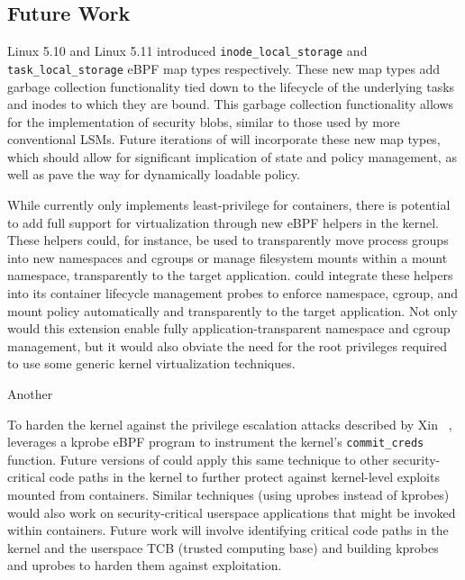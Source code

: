 \subsection{Future Work}
\label{sub:future_work}

Linux 5.10 and Linux 5.11 introduced \texttt{inode\_local\_storage} \cite{singh2020_inode_local_storage} and \texttt{task\_local\_storage} \cite{singh2020_task_local_storage} eBPF map types respectively. These new map types add garbage collection functionality tied down to the lifecycle of the underlying tasks and inodes to which they are bound. This garbage collection functionality allows for the implementation of security blobs, similar to those used by more conventional LSMs. Future iterations of \bpfcontain{} will incorporate these new map types, which should allow for significant implication of state and policy management, as well as pave the way for dynamically loadable \bpfcontain{} policy.

While \bpfcontain{} currently only implements least-privilege for containers, there is potential to add full support for virtualization through new eBPF helpers in the kernel. These helpers could, for instance, be used to transparently move process groups into new namespaces and cgroups or manage filesystem mounts within a mount namespace, transparently to the target application. \bpfcontain{} could integrate these helpers into its container lifecycle management probes to enforce namespace, cgroup, and mount policy automatically and transparently to the target application. Not only would this extension enable fully application-transparent namespace and cgroup management, but it would also obviate the need for the root privileges required to use some generic kernel virtualization techniques.

Another



To harden the kernel against the privilege escalation attacks described by Xin \etal~\cite{xin2018_container_security}, \bpfcontain{} leverages a kprobe eBPF program to instrument the kernel's \texttt{commit\_creds} function. Future versions of \bpfcontain{} could apply this same technique to other security-critical code paths in the kernel to further protect against kernel-level exploits mounted from containers. Similar techniques (using uprobes instead of kprobes) would also work on security-critical userspace applications that might be invoked within containers. Future work will involve identifying critical code paths in the kernel and the userspace TCB (trusted computing base) and building \bpfcontain{} kprobes and uprobes to harden them against exploitation.
